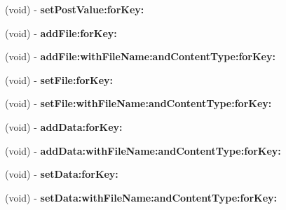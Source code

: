\begin{DoxyCompactItemize}
\item 
\hypertarget{interface_a_s_i_form_data_request_a90236e7099afbab72bb160029df5a368}{
(void) -\/ {\bfseries set\-Post\-Value\-:for\-Key\-:}}
\label{interface_a_s_i_form_data_request_a90236e7099afbab72bb160029df5a368}

\item 
\hypertarget{interface_a_s_i_form_data_request_afa340cd3b263a621a4f52015cdb8c568}{
(void) -\/ {\bfseries add\-File\-:for\-Key\-:}}
\label{interface_a_s_i_form_data_request_afa340cd3b263a621a4f52015cdb8c568}

\item 
\hypertarget{interface_a_s_i_form_data_request_ae413f676daaf869aa3cac76371466c16}{
(void) -\/ {\bfseries add\-File\-:with\-File\-Name\-:and\-Content\-Type\-:for\-Key\-:}}
\label{interface_a_s_i_form_data_request_ae413f676daaf869aa3cac76371466c16}

\item 
\hypertarget{interface_a_s_i_form_data_request_a8b097474a664290880231fd4439f352e}{
(void) -\/ {\bfseries set\-File\-:for\-Key\-:}}
\label{interface_a_s_i_form_data_request_a8b097474a664290880231fd4439f352e}

\item 
\hypertarget{interface_a_s_i_form_data_request_a1b319de7b302e41e0f2b62b04efd4976}{
(void) -\/ {\bfseries set\-File\-:with\-File\-Name\-:and\-Content\-Type\-:for\-Key\-:}}
\label{interface_a_s_i_form_data_request_a1b319de7b302e41e0f2b62b04efd4976}

\item 
\hypertarget{interface_a_s_i_form_data_request_abeb27ef3dc358d5e0a27ba3a077a6653}{
(void) -\/ {\bfseries add\-Data\-:for\-Key\-:}}
\label{interface_a_s_i_form_data_request_abeb27ef3dc358d5e0a27ba3a077a6653}

\item 
\hypertarget{interface_a_s_i_form_data_request_a8ea88f81e036a80e7e7b7f9af04ac421}{
(void) -\/ {\bfseries add\-Data\-:with\-File\-Name\-:and\-Content\-Type\-:for\-Key\-:}}
\label{interface_a_s_i_form_data_request_a8ea88f81e036a80e7e7b7f9af04ac421}

\item 
\hypertarget{interface_a_s_i_form_data_request_a707a5cef615835146cdbed3ceca31016}{
(void) -\/ {\bfseries set\-Data\-:for\-Key\-:}}
\label{interface_a_s_i_form_data_request_a707a5cef615835146cdbed3ceca31016}

\item 
\hypertarget{interface_a_s_i_form_data_request_abbcca0f83bbe93f0132094a99a274098}{
(void) -\/ {\bfseries set\-Data\-:with\-File\-Name\-:and\-Content\-Type\-:for\-Key\-:}}
\label{interface_a_s_i_form_data_request_abbcca0f83bbe93f0132094a99a274098}


\end{DoxyCompactItemize}
